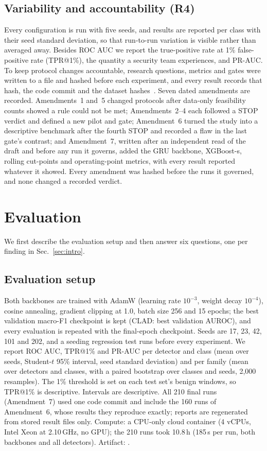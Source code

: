 \documentclass[conference]{IEEEtran}
\newif\ifanonymous
\newcommand{\confirm}[1]{\textcolor{red}{[#1]}}
\newcommand{\artifact}{\ifanonymous\url{https://anonymous.4open.science/r/XXXXXXXX}\else\confirm{public repository URL}\fi}
\begin{document}
\subsection{Variability and accountability (R4)}
\label{sec:prereg}
Every configuration is run with five seeds, and results are reported per class with their seed standard deviation, so that run-to-run variation is visible rather than averaged away. Besides ROC AUC we report the true-positive rate at 1\% false-positive rate (TPR@1\%), the quantity a security team experiences, and PR-AUC. To keep protocol changes accountable, research questions, metrics and gates were written to a file and hashed before each experiment, and every result records that hash, the code commit and the dataset hashes~\cite{nosek2018}. Seven dated amendments are recorded. Amendments~1 and~5 changed protocols after data-only feasibility counts showed a rule could not be met; Amendments~2--4 each followed a STOP verdict and defined a new pilot and gate; Amendment~6 turned the study into a descriptive benchmark after the fourth STOP and recorded a flaw in the last gate's contrast; and Amendment~7, written after an independent read of the draft and before any run it governs, added the GRU backbone, XGBoost-s, rolling cut-points and operating-point metrics, with every result reported whatever it showed. Every amendment was hashed before the runs it governed, and none changed a recorded verdict.

\section{Evaluation}
\label{sec:eval}
We first describe the evaluation setup and then answer six questions, one per finding in Sec.~\ref{sec:intro}.

\subsection{Evaluation setup}
Both backbones are trained with AdamW (learning rate $10^{-3}$, weight decay $10^{-4}$), cosine annealing, gradient clipping at 1.0, batch size 256 and 15 epochs; the best validation macro-F1 checkpoint is kept (CLAD: best validation AUROC), and every evaluation is repeated with the final-epoch checkpoint. Seeds are 17, 23, 42, 101 and 202, and a seeding regression test runs before every experiment. We report ROC AUC, TPR@1\% and PR-AUC per detector and class (mean over seeds, Student-$t$ 95\% interval, seed standard deviation) and per family (mean over detectors and classes, with a paired bootstrap over classes and seeds, 2,000 resamples). The 1\% threshold is set on each test set's benign windows, so TPR@1\% is descriptive. Intervals are descriptive. All 210 final runs (Amendment~7) used one code commit and include the 160 runs of Amendment~6, whose results they reproduce exactly; reports are regenerated from stored result files only. Compute: a CPU-only cloud container (4 vCPUs, Intel Xeon at 2.10\,GHz, no GPU); the 210 runs took 10.8\,h (185\,s per run, both backbones and all detectors). Artifact: \artifact.
\end{document}
